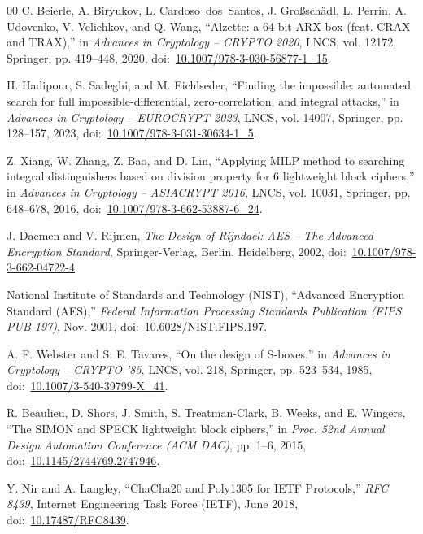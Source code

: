\documentclass[10pt,twocolumn]{article}
\begin{document}
\begin{thebibliography}{00}
C. Beierle, A. Biryukov, L. Cardoso~dos~Santos, J. Gro{\ss}sch\"{a}dl, L. Perrin, A. Udovenko, V. Velichkov, and Q. Wang, ``Alzette: a 64-bit ARX-box (feat. CRAX and TRAX),'' in \textit{Advances in Cryptology -- CRYPTO 2020}, LNCS, vol. 12172, Springer, pp. 419--448, 2020, doi:~\href{https://doi.org/10.1007/978-3-030-56877-1_15}{10.1007/978-3-030-56877-1\_15}.

H. Hadipour, S. Sadeghi, and M. Eichlseder, ``Finding the impossible: automated search for full impossible-differential, zero-correlation, and integral attacks,'' in \textit{Advances in Cryptology -- EUROCRYPT 2023}, LNCS, vol. 14007, Springer, pp. 128--157, 2023, doi:~\href{https://doi.org/10.1007/978-3-031-30634-1_5}{10.1007/978-3-031-30634-1\_5}.

Z. Xiang, W. Zhang, Z. Bao, and D. Lin, ``Applying MILP method to searching integral distinguishers based on division property for 6 lightweight block ciphers,'' in \textit{Advances in Cryptology -- ASIACRYPT 2016}, LNCS, vol. 10031, Springer, pp. 648--678, 2016, doi:~\href{https://doi.org/10.1007/978-3-662-53887-6_24}{10.1007/978-3-662-53887-6\_24}.

J. Daemen and V. Rijmen, \textit{The Design of Rijndael: AES -- The Advanced Encryption Standard}, Springer-Verlag, Berlin, Heidelberg, 2002, doi:~\href{https://doi.org/10.1007/978-3-662-04722-4}{10.1007/978-3-662-04722-4}.

National Institute of Standards and Technology (NIST), ``Advanced Encryption Standard (AES),'' \textit{Federal Information Processing Standards Publication (FIPS PUB 197)}, Nov. 2001, doi:~\href{https://doi.org/10.6028/NIST.FIPS.197}{10.6028/NIST.FIPS.197}.

A. F. Webster and S. E. Tavares, ``On the design of S-boxes,'' in \textit{Advances in Cryptology -- CRYPTO '85}, LNCS, vol. 218, Springer, pp. 523--534, 1985, doi:~\href{https://doi.org/10.1007/3-540-39799-X_41}{10.1007/3-540-39799-X\_41}.

R. Beaulieu, D. Shors, J. Smith, S. Treatman-Clark, B. Weeks, and E. Wingers, ``The SIMON and SPECK lightweight block ciphers,'' in \textit{Proc. 52nd Annual Design Automation Conference (ACM DAC)}, pp. 1--6, 2015, doi:~\href{https://doi.org/10.1145/2744769.2747946}{10.1145/2744769.2747946}.

Y. Nir and A. Langley, ``ChaCha20 and Poly1305 for IETF Protocols,'' \textit{RFC 8439}, Internet Engineering Task Force (IETF), June 2018, doi:~\href{https://doi.org/10.17487/RFC8439}{10.17487/RFC8439}.


\end{thebibliography}
\end{document}
